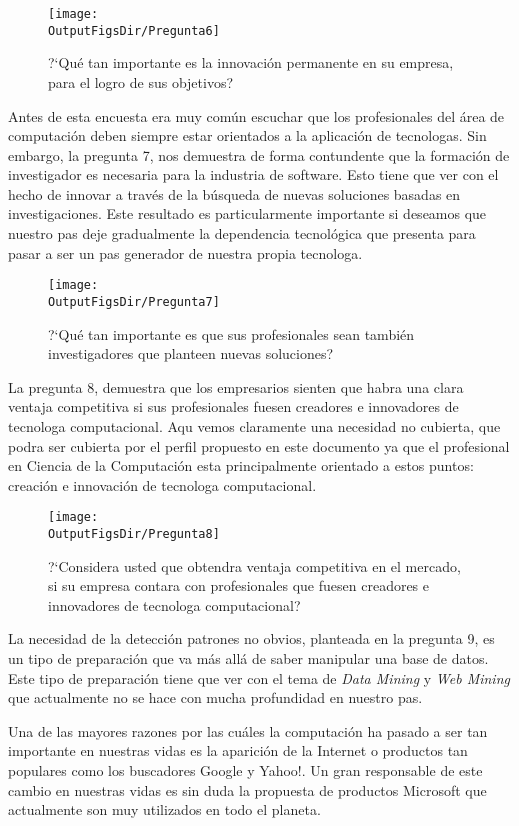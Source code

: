 \begin{figure}[!h]
	\centering
	\texttt{[image: \\OutputFigsDir/Pregunta6]}
	\label{fig:Preg6}
	\caption{?`Qué tan importante es la innovación permanente en su empresa, para el logro de sus objetivos?}
\end{figure}

Antes de esta encuesta era muy común escuchar que los profesionales del área de computación deben siempre estar orientados a la aplicación de tecnolog­as. Sin embargo, la pregunta 7, nos demuestra de forma contundente que la formación de investigador es necesaria para la industria de software. Esto tiene que ver con el hecho de innovar a través de la búsqueda de nuevas soluciones basadas en investigaciones. Este resultado es particularmente importante si deseamos que nuestro pa­s deje gradualmente la dependencia tecnológica que presenta para pasar a ser un pa­s generador de nuestra propia tecnolog­a.

\begin{figure}[!h]
	\centering
	\texttt{[image: \\OutputFigsDir/Pregunta7]}
	\label{fig:Preg7}
	\caption{?`Qué tan importante es que sus profesionales sean también investigadores que planteen nuevas soluciones?}
\end{figure}

La pregunta 8, demuestra que los empresarios sienten que habr­a una clara ventaja competitiva si sus profesionales fuesen creadores e innovadores de tecnolog­a computacional. Aqu­ vemos claramente una necesidad no cubierta, que podr­a ser cubierta por el perfil propuesto en este documento ya que el profesional en Ciencia de la Computación esta principalmente orientado a estos puntos: creación e innovación de tecnolog­a computacional.

\begin{figure}[!h]
	\centering
	\texttt{[image: \\OutputFigsDir/Pregunta8]}
	\label{fig:Preg8}
	\caption{?`Considera usted que obtendr­a ventaja competitiva en el mercado, si su empresa contara con profesionales que fuesen creadores e innovadores de tecnolog­a computacional?}
\end{figure}

La necesidad de la detección patrones no obvios, planteada en la pregunta 9,  es un tipo de preparación que va más allá de saber manipular una base de datos. Este tipo de preparación tiene que ver con el tema de \textit{Data Mining} y \textit{Web Mining} que actualmente no se hace con mucha profundidad en nuestro pa­s.

Una de las mayores razones por las cuáles la computación ha pasado a ser tan importante en nuestras vidas es la aparición de la Internet o productos tan populares como los buscadores Google y Yahoo!. Un gran responsable de este cambio en nuestras vidas es sin duda la propuesta de productos Microsoft que actualmente son muy utilizados en todo el planeta. 

